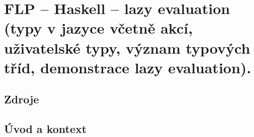 

\graphicspath{{flp/haskell/figures}}


\chapter{FLP -- Haskell -- lazy evaluation (typy v jazyce včetně akcí, uživatelské typy, význam typových tříd, demonstrace lazy evaluation).}


\section{Zdroje}

\begin{compactitem}
    \item {}
    \item {}
    \item {}
\end{compactitem}


\section{Úvod a kontext}

\begin{compactitem}
    \item {}
\end{compactitem}
